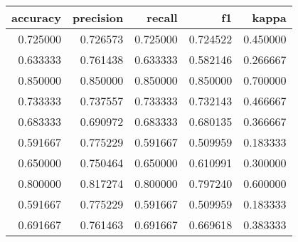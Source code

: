 \begin{tabular}{rrrrr}
\toprule
accuracy & precision & recall & f1 & kappa \\
\midrule
0.725000 & 0.726573 & 0.725000 & 0.724522 & 0.450000 \\
0.633333 & 0.761438 & 0.633333 & 0.582146 & 0.266667 \\
0.850000 & 0.850000 & 0.850000 & 0.850000 & 0.700000 \\
0.733333 & 0.737557 & 0.733333 & 0.732143 & 0.466667 \\
0.683333 & 0.690972 & 0.683333 & 0.680135 & 0.366667 \\
0.591667 & 0.775229 & 0.591667 & 0.509959 & 0.183333 \\
0.650000 & 0.750464 & 0.650000 & 0.610991 & 0.300000 \\
0.800000 & 0.817274 & 0.800000 & 0.797240 & 0.600000 \\
0.591667 & 0.775229 & 0.591667 & 0.509959 & 0.183333 \\
0.691667 & 0.761463 & 0.691667 & 0.669618 & 0.383333 \\
\bottomrule
\end{tabular}
